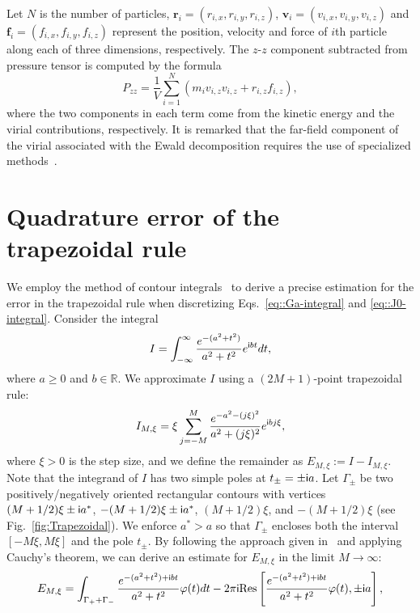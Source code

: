 Let $N$ is the number of particles, $\bm{r}_i=(r_{i,x},r_{i,y},r_{i,z})$, $\bm{v}_i=(v_{i,x},v_{i,y},v_{i,z})$ and $\bm{f}_i=(f_{i,x},f_{i,y},f_{i,z})$ represent the position, velocity and force of $i$th particle along each of three dimensions, respectively. The $z$-$z$ component subtracted from pressure tensor is computed by the formula
\begin{equation}
P_{zz}=\frac{1}{V} \sum_{i=1}^N\left(m_i v_{i,z} v_{i, z}+r_{i,z} f_{i,z}\right),
\end{equation}
where the two components in each term come from the kinetic energy and the virial contributions, respectively. It is remarked that the far-field component of  {the} virial associated with the Ewald decomposition requires the use of specialized methods~\cite{liang2022random}. 

\section{Quadrature error of the trapezoidal rule}\label{app::trapezoidal}
We employ the method of contour integrals~\cite{Donaldson1972SINUA,trefethen2014Rev} to derive a precise estimation for the error in the trapezoidal rule when discretizing Eqs.~\eqref{eq::Ga-integral} and \eqref{eq::J0-integral}. Consider the integral
\begin{equation}\label{eq::A.1}
I=\int_{-\infty}^{\infty }\frac{e^{-(a^2+t^2)}}{a^2+t^2}e^{\mathsf i b t}dt,
\end{equation}
where $a\geq 0$ and $b\in\mathbb{R}$. We approximate $I$ using a $(2M+1)$-point trapezoidal rule:
\begin{equation}
I_{M,\xi}=\xi\sum_{j=-M}^{M}\frac{e^{-a^2-(j\xi)^2}}{a^2+(j\xi)^2}e^{\mathsf i b j\xi},
\end{equation}
where $\xi>0$ is the step size, and we define the remainder as $E_{M,\xi}:=I-I_{M,\xi}$. Note that the integrand of $I$ has two simple poles at $t_{\pm}=\pm \mathsf i a$. Let $\Gamma_{\pm}$ be two positively/negatively oriented rectangular contours with vertices $(M+1/2)\xi\pm\mathsf i a^*$, $-(M+1/2)\xi\pm\mathsf i a^*$, $(M+1/2)\xi$, and $-(M+1/2)\xi$ (see Fig.~\ref{fig:Trapezoidal}). We enforce $a^*>a$ so that $\Gamma_{\pm}$ encloses both the interval $[-M \xi,M \xi]$ and the pole $t_{\pm}$. By following the approach given in~\cite{Donaldson1972SINUA} and applying Cauchy's theorem, we can derive an estimate for $E_{M,\xi}$ in the limit $M\rightarrow \infty$:
\begin{equation}
E_{M,\xi}=\int_{\Gamma_++\Gamma_-}\frac{e^{-(a^2+t^2)+\mathsf i b t}}{a^2+t^2}\varphi(t)dt-2\pi\mathsf i \text{Res}\left[\frac{e^{-(a^2+t^2)+\mathsf i b t}}{a^2+t^2}\varphi(t),\pm \mathsf i a\right],
\end{equation}
